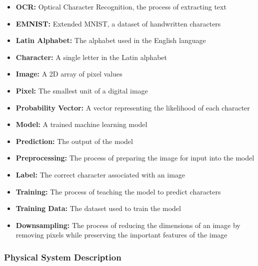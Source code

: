 \documentclass[12pt]{article}
\begin{document}
\begin{itemize}

\item \textbf{OCR:} Optical Character Recognition, the process of extracting text
\item \textbf{EMNIST:} Extended MNIST, a dataset of handwritten characters
\item \textbf{Latin Alphabet:} The alphabet used in the English language
\item \textbf{Character:} A single letter in the Latin alphabet
\item \textbf{Image:} A 2D array of pixel values
\item \textbf{Pixel:} The smallest unit of a digital image
\item \textbf{Probability Vector:} A vector representing the likelihood of each character
\item \textbf{Model:} A trained machine learning model
\item \textbf{Prediction:} The output of the model
\item \textbf{Preprocessing:} The process of preparing the image for input into the model
\item \textbf{Label:} The correct character associated with an image
\item \textbf{Training:} The process of teaching the model to predict characters
\item \textbf{Training Data:} The dataset used to train the model
\item \textbf{Downsampling:} The process of reducing the dimensions of an image by removing pixels while preserving the important features of the image

\end{itemize}

\subsubsection{Physical System Description} \label{sec_phySystDescrip}

\end{document}
